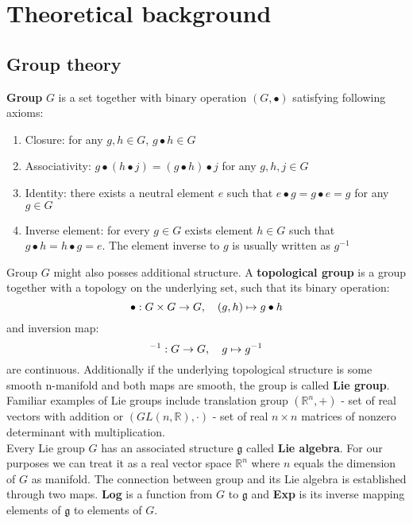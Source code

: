 \section{Theoretical background}

\subsection{Group theory}
    \textbf{Group} $G$ is a set together with binary operation $\left(G, \bullet \right)$ satisfying
    following axioms:
    \begin{enumerate}
        \item Closure: for any $g, h \in G$, $g \bullet h \in G$
        \item Associativity:  $g\bullet \left(h \bullet j \right) =
                    \left(g \bullet h \right) \bullet j$ for any $g,h,j \in G$
        \item Identity: there exists a neutral element $e$ such that
                $e \bullet g = g \bullet e = g$ for any $g \in G$
        \item Inverse element: for every $g \in G$ exists element $h \in G$ such that
                $g \bullet h = h\bullet g = e$. The element inverse to $g$ is usually
                written as $g^{-1}$
    \end{enumerate}
    \par Group $G$ might also posses additional structure. A \textbf{topological group}
        is a group together with a topology on the underlying set,
        such that its binary operation:\\
        $$\bullet: G \times G \to G, \hspace*{1em} \left(g,h \right) \mapsto g\bullet h$$
        and inversion map: \\
        $${}^{-1}: G \to G, \hspace*{1em} g \mapsto g^{-1}$$
        are continuous. Additionally if the underlying topological structure
        is some smooth n-manifold and both maps are smooth, the group is called
        \textbf{Lie group}. Familiar examples of Lie groups include translation group
        $\left( \mathbb{R}^n, + \right)$ - set of real vectors with addition or
        $\left(GL(n,\mathbb{R}), \cdot \right)$ - set of real $n \times n$ matrices of nonzero determinant
        with multiplication.\\
        Every Lie group $G$ has an associated structure $\mathfrak{g}$ called \textbf{Lie
        algebra}. For our purposes we can treat it as a real vector space
        $\mathbb{R}^n$ where $n$ equals the dimension of $G$ as manifold. The
        connection between group and its Lie algebra is established through two
        maps. \textbf{Log} is a function from $G$ to $\mathfrak{g}$ and \textbf{Exp}
        is its inverse
        mapping elements of $\mathfrak{g}$ to elements of $G$.


